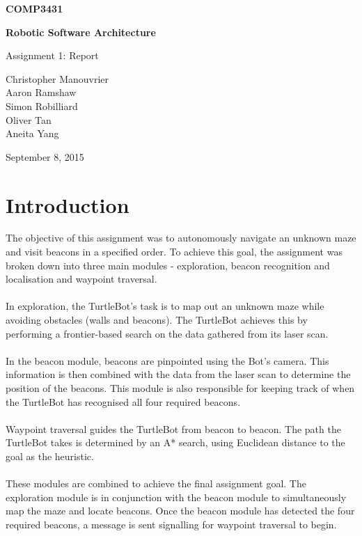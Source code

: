 \documentclass[titlepage,12pt,a4paper]{article}
\begin{document}
\begin{titlepage}
    \begin{center}
        \vspace*{3cm}
        
        \Huge
        \textbf{COMP3431\\}
        \title{}
        \vspace{0.5cm}
        \Huge
        \textbf{Robotic Software Architecture}
        
        \vspace{0.54cm}
        
        \Large
        Assignment 1: Report
        
        \vspace{5cm}

	\normalsize
	Christopher Manouvrier\\
	Aaron Ramshaw\\
	Simon Robilliard\\
	Oliver Tan\\
	Aneita Yang
        
	\vfill
        
        \Large
        September 8, 2015
        
    \end{center}
\end{titlepage}

\pagebreak

\section*{Introduction}
The objective of this assignment was to autonomously navigate an unknown maze and visit beacons in a specified order. To achieve this goal, the assignment was broken down into three main modules - exploration, beacon recognition and localisation and waypoint traversal. \\
\\
In exploration, the TurtleBot's task is to map out an unknown maze while avoiding obstacles (walls and beacons). The TurtleBot achieves this by performing a frontier-based search on the data gathered from its laser scan.\\
\\
In the beacon module, beacons are pinpointed using the Bot's camera. This information is then combined with the data from the laser scan to determine the position of the beacons. This module is also responsible for keeping track of when the TurtleBot has recognised all four required beacons. \\
\\
Waypoint traversal guides the TurtleBot from beacon to beacon. The path the TurtleBot takes is determined by an A* search, using Euclidean distance to the goal as the heuristic. \\
\\
These modules are combined to achieve the final assignment goal. The exploration module is in conjunction with the beacon module to simultaneously map the maze and locate beacons. Once the beacon module has detected the four required beacons, a message is sent signalling for waypoint traversal to begin. \\
\end{document}
